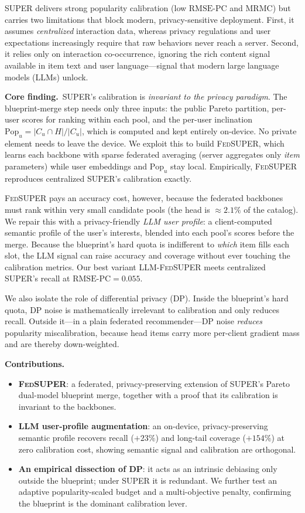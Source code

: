 \documentclass{article}
\newcommand{\Fed}{\textsc{FedSUPER}}
\newcommand{\LLMSuper}{\textsc{LLM-FedSUPER}}
\newcommand{\Pop}{\mathrm{Pop}}
\newcommand{\RMSEPC}{\mathrm{RMSE\text{-}PC}}
\newcommand{\MRMC}{\mathrm{MRMC}}
\begin{document}
SUPER delivers strong popularity calibration (low \(\RMSEPC\) and \(\MRMC\)) but carries two
limitations that block modern, privacy-sensitive deployment. First, it assumes \emph{centralized}
interaction data, whereas privacy regulations and user expectations increasingly require that raw
behaviors never reach a server. Second, it relies only on interaction co-occurrence, ignoring the
rich content signal available in item text and user language---signal that modern large language
models (LLMs) unlock.

\textbf{Core finding.}\ SUPER's calibration is \emph{invariant to the privacy paradigm}. The
blueprint-merge step needs only three inputs: the public Pareto partition, per-user scores for
ranking within each pool, and the per-user inclination \(\Pop_u = |C_u \cap H|/|C_u|\), which is
computed and kept entirely on-device. No private element needs to leave the device. We exploit this
to build \Fed{}, which learns each backbone with sparse federated averaging (server aggregates
only \emph{item} parameters) while user embeddings and \(\Pop_u\) stay local. Empirically,
\Fed{} reproduces centralized SUPER's calibration exactly.

\Fed{} pays an accuracy cost, however, because the federated backbones must rank within very small
candidate pools (the head is \(\approx 2.1\%\) of the catalog). We repair this with a
privacy-friendly \emph{LLM user profile}: a client-computed semantic profile of the user's
interests, blended into each pool's scores before the merge. Because the blueprint's hard quota is
indifferent to \emph{which} item fills each slot, the LLM signal can raise accuracy and coverage
without ever touching the calibration metrics. Our best variant \LLMSuper{} meets centralized
SUPER's recall at \(\RMSEPC{}=0.055\).

We also isolate the role of differential privacy (DP). Inside the blueprint's hard quota, DP noise
is mathematically irrelevant to calibration and only reduces recall. Outside it---in a plain
federated recommender---DP noise \emph{reduces} popularity miscalibration, because head items carry
more per-client gradient mass and are thereby down-weighted.

\textbf{Contributions.}
\begin{itemize}
\item \textbf{\Fed{}}: a federated, privacy-preserving extension of SUPER's Pareto dual-model
blueprint merge, together with a proof that its calibration is invariant to the backbones.
\item \textbf{LLM user-profile augmentation}: an on-device, privacy-preserving semantic profile
recovers recall (\(+23\%\)) and long-tail coverage (\(+154\%\)) at zero calibration cost, showing
semantic signal and calibration are orthogonal.
\item \textbf{An empirical dissection of DP}: it acts as an intrinsic debiasing only outside the
blueprint; under SUPER it is redundant. We further test an adaptive popularity-scaled budget and a
multi-objective penalty, confirming the blueprint is the dominant calibration lever.
\end{itemize}
\end{document}
